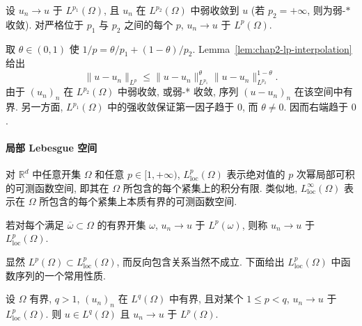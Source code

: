 \begin{Corollary}
\label{cor:chap2-intermediate-lp-strong-convergence}
设 $u_n\to u$ 于 $L^{p_1}(\Omega)$, 且 $u_n$ 在 $L^{p_2}(\Omega)$ 中弱收敛到 $u$ (若 $p_2=+\infty$, 则为弱-$*$ 收敛). 对严格位于 $p_1$ 与 $p_2$ 之间的每个 $p$, $u_n\to u$ 于 $L^p(\Omega)$.
\end{Corollary}

\begin{Proof}
取 $\theta\in(0,1)$ 使 $1/p=\theta/p_1+(1-\theta)/p_2$. Lemma~\ref{lem:chap2-lp-interpolation} 给出
\[
 \|u-u_n\|_{L^p}\leq\|u-u_n\|_{L^{p_1}}^\theta\|u-u_n\|_{L^{p_2}}^{1-\theta}.
\]
由于 $(u_n)_n$ 在 $L^{p_2}(\Omega)$ 中弱收敛, 或弱-* 收敛, 序列 $(u-u_n)_n$ 在该空间中有界. 另一方面, $L^{p_1}(\Omega)$ 中的强收敛保证第一因子趋于 $0$, 而 $\theta\neq0$. 因而右端趋于 $0$.
\end{Proof}

\paragraph{局部 Lebesgue 空间}

\begin{Definition}
\label{def:chap2-local-lebesgue-spaces}
对 $\mathbb{R}^d$ 中任意开集 $\Omega$ 和任意 $p\in[1,+\infty)$, $L^p_{\mathrm{loc}}(\Omega)$ 表示绝对值的 $p$ 次幂局部可积的可测函数空间, 即其在 $\Omega$ 所包含的每个紧集上的积分有限. 类似地, $L^\infty_{\mathrm{loc}}(\Omega)$ 表示在 $\Omega$ 所包含的每个紧集上本质有界的可测函数空间.
\end{Definition}

若对每个满足 $\overline\omega\subset\Omega$ 的有界开集 $\omega$, $u_n\to u$ 于 $L^p(\omega)$, 则称 $u_n\to u$ 于 $L^p_{\mathrm{loc}}(\Omega)$.

显然 $L^p(\Omega)\subset L^p_{\mathrm{loc}}(\Omega)$, 而反向包含关系当然不成立. 下面给出 $L^p_{\mathrm{loc}}(\Omega)$ 中函数序列的一个常用性质.

\begin{Proposition}
\label{prop:chap2-local-to-global-lp-convergence}
设 $\Omega$ 有界, $q>1$, $(u_n)_n$ 在 $L^q(\Omega)$ 中有界, 且对某个 $1\leq p<q$, $u_n\to u$ 于 $L^p_{\mathrm{loc}}(\Omega)$. 则 $u\in L^q(\Omega)$ 且 $u_n\to u$ 于 $L^p(\Omega)$.
\end{Proposition}

